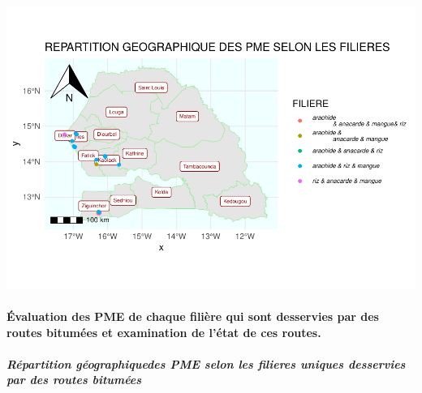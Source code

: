 \documentclass[
]{article}
\begin{document}
\begin{center}\includegraphics{Projet_R_ISE_1_files/figure-latex/unnamed-chunk-40-1} \end{center}

\hfill\break

\hypertarget{uxe9valuation-des-pme-de-chaque-filiuxe8re-qui-sont-desservies-par-des-routes-bitumuxe9es-et-examination-de-luxe9tat-de-ces-routes.}{%
\paragraph{Évaluation des PME de chaque filière qui sont desservies par
des routes bitumées et examination de l'état de ces
routes.}\label{uxe9valuation-des-pme-de-chaque-filiuxe8re-qui-sont-desservies-par-des-routes-bitumuxe9es-et-examination-de-luxe9tat-de-ces-routes.}}

\hfill\break

\hypertarget{ruxe9partition-guxe9ographiquedes-pme-selon-les-filieres-uniques-desservies-par-des-routes-bitumuxe9es}{%
\subparagraph{Répartition géographiquedes PME selon les filieres uniques
desservies par des routes
bitumées}\label{ruxe9partition-guxe9ographiquedes-pme-selon-les-filieres-uniques-desservies-par-des-routes-bitumuxe9es}}

\hfill\break
\end{document}
